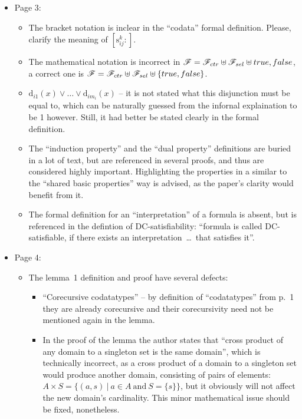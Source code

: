 \begin{itemize}
	\item Page 3:
	\begin{itemize}
		\item The bracket notation is inclear in the ``codata'' formal definition. Please, clarify the meaning of $\left[ \mathrm{s}^{k}_{ij} : \right]$.
		\item The mathematical notation is incorrect in $\mathscr{F} = \mathscr{F}_{ctr} \uplus \mathscr{F}_{sel} \uplus true,false$, a correct one is $\mathscr{F} = \mathscr{F}_{ctr} \uplus \mathscr{F}_{sel} \uplus \{true,false\}$.
		\item $\mathrm{d}_{i1}(x) \lor \dots \lor \mathrm{d}_{im_i}(x)$ -- it is not stated what this disjunction must be equal to, which can be naturally guessed from the infornal explaination to be 1 however. Still, it had better be stated clearly in the formal definition.
		\item The ``induction property'' and the ``dual property'' definitions are buried in a lot of text, but are referenced in several proofs, and thus are considered highly important. Highlighting the properties in a similar to the ``shared basic properties'' way is advised, as the paper's clarity would benefit from it.
		\item The formal definition for an ``interpretation'' of a formula is absent, but is referenced in the defintion of DC-satisfiability: ``formula is called DC-satisfiable, if there exists an interpretation~\dots~that satisfies it''.
	\end{itemize}

	\item Page 4:
	\begin{itemize}
		\item The lemma~1 definition and proof have several defects:
		\begin{itemize}
			\item ``Corecursive codatatypes'' -- by definition of ``codatatypes'' from p.~1 they are already corecursive and their corecursivity need not be mentioned again in the lemma.
			\item In the proof of the lemma the author states that ``cross product of any domain to a singleton set is the same domain'', which is technically incorrect, as a cross product of a domain to a singleton set would produce another domain, consisting of pairs of elements: $A \times S = \{ (a, s)~|~a \in A~\mathrm{and}~S = \{s\} \}$, but it obviously will not affect the new domain's cardinality. This minor mathematical issue should be fixed, nonetheless.
		\end{itemize}
	\end{itemize}


\end{itemize}
